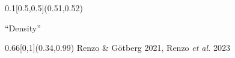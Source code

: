 \documentclass[xcolor=dvipsnames,professionalfonts, aspectratio=169]{beamer}
\begin{document}
\begin{frame}
{    \begin{textblock}{0.1}[0.5,0.5](0.51,0.52)
      \begin{sideways}
        \textcolor{whiteish}{``Density''}
      \end{sideways}
    \end{textblock}


    \begin{textblock}{0.66}[0,1](0.34,0.99)
      \textcolor{gray!50}{\tiny Renzo \& G\"otberg 2021, Renzo \emph{et al.} 2023}\,
    \end{textblock}
  }
\end{frame}
\end{document}
